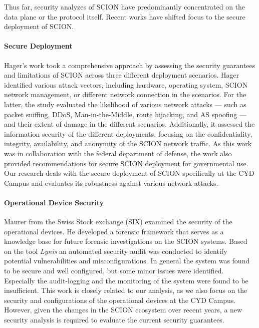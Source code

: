 Thus far, security analyzes of SCION have predominantly concentrated on the data plane or the protocol itself.
Recent works have shifted focus to the secure deployment of SCION.

\paragraph{Secure Deployment}
Hager's work \cite{Hager2024} took a comprehensive approach by assessing the security guarantees and limitations of SCION across three different deployment scenarios.
Hager identified various attack vectors, including hardware, operating system, SCION network management, or different network connection in the scenarios.
For the latter, the study evaluated the likelihood of various network attacks --- such as packet sniffing, DDoS, Man-in-the-Middle, route hijacking, and AS spoofing --- and their extent of damage in the different scenarios.
Additionally, it assessed the information security of the different deployments, focusing on the confidentiality, integrity, availability, and anonymity of the SCION network traffic.
As this work was in collaboration with the federal department of defense, the work also provided recommendations for secure SCION deployment for governmental use.
Our research deals with the secure deployment of SCION specifically at the CYD Campus and evaluates its robustness against various network attacks.


\paragraph{Operational Device Security}
\label{sec:operational-device-security}
Maurer \cite{Maurer2021} from the Swiss Stock exchange (SIX) examined the security of the operational devices.
He developed a forensic framework that serves as a knowledge base for future forensic investigations on the SCION systems.
Based on the tool \textit{Lynis} an automated security audit was conducted to identify potential vulnerabilities and misconfigurations.
In general the system was found to be secure and well configured, but some minor issues were identified.
Especially the audit-logging and the monitoring of the system were found to be insufficient.
This work is closely related to our analysis, as we also focus on the security and configurations of the operational devices at the CYD Campus.
However, given the changes in the SCION ecosystem over recent years, a new security analysis is required to evaluate the current security guarantees.

